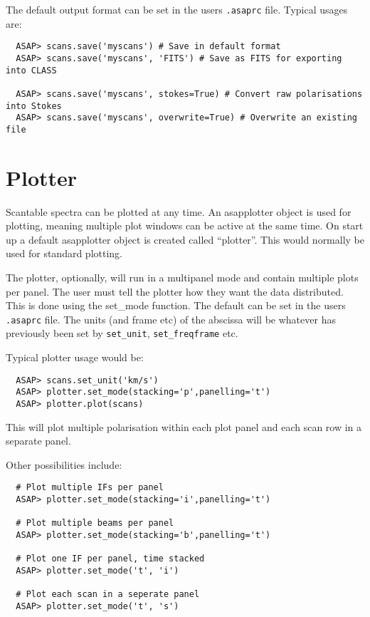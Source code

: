\documentclass[11pt]{article}
\newcommand{\cmd}[1]{{\tt #1}}
\begin{document}
The default output format can be set in the users {\tt .asaprc} file.
Typical usages are:

\begin{verbatim}
  ASAP> scans.save('myscans') # Save in default format
  ASAP> scans.save('myscans', 'FITS') # Save as FITS for exporting into CLASS

  ASAP> scans.save('myscans', stokes=True) # Convert raw polarisations into Stokes
  ASAP> scans.save('myscans', overwrite=True) # Overwrite an existing file
\end{verbatim}


\section{Plotter}

Scantable spectra can be plotted at any time. An asapplotter object is
used for plotting, meaning multiple plot windows can be active at the
same time. On start up a default asapplotter object is created called
``plotter''. This would normally be used for standard plotting.

The plotter, optionally, will run in a multipanel mode and contain
multiple plots per panel. The user must tell the plotter how they want
the data distributed. This is done using the set\_mode function. The
default can be set in the users {\tt .asaprc} file. The units (and frame
etc) of the abscissa will be whatever has previously been set by
\cmd{set\_unit}, \cmd{set\_freqframe} etc.

Typical plotter usage would be:

\begin{verbatim}
  ASAP> scans.set_unit('km/s')
  ASAP> plotter.set_mode(stacking='p',panelling='t')
  ASAP> plotter.plot(scans)
\end{verbatim}

This will plot multiple polarisation within each plot panel and each
scan row in a separate panel.

Other possibilities include:

\begin{verbatim}
  # Plot multiple IFs per panel
  ASAP> plotter.set_mode(stacking='i',panelling='t')

  # Plot multiple beams per panel
  ASAP> plotter.set_mode(stacking='b',panelling='t')

  # Plot one IF per panel, time stacked
  ASAP> plotter.set_mode('t', 'i')

  # Plot each scan in a seperate panel
  ASAP> plotter.set_mode('t', 's')

\end{verbatim}
\end{document}
